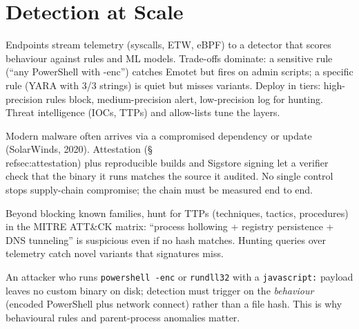 \section{Detection at Scale}
\label{sec:detection-scale}
Endpoints stream telemetry (syscalls, ETW, eBPF) to a detector that scores behaviour against rules and ML models. Trade-offs dominate: a sensitive rule (``any PowerShell with -enc'') catches Emotet but fires on admin scripts; a specific rule (YARA with 3/3 strings) is quiet but misses variants. Deploy in tiers: high-precision rules block, medium-precision alert, low-precision log for hunting. Threat intelligence (IOCs, TTPs) and allow-lists tune the layers.

\begin{remark}
Modern malware often arrives via a compromised dependency or update (SolarWinds, 2020). Attestation (\S\\ref{sec:attestation}) plus reproducible builds and Sigstore signing let a verifier check that the binary it runs matches the source it audited. No single control stops supply-chain compromise; the chain must be measured end to end.
\end{remark}

\begin{remark}
Beyond blocking known families, hunt for TTPs (techniques, tactics, procedures) in the MITRE ATT\&CK matrix: ``process hollowing + registry persistence + DNS tunneling'' is suspicious even if no hash matches. Hunting queries over telemetry catch novel variants that signatures miss.
\end{remark}

{\sloppy
\begin{example}
An attacker who runs \texttt{powershell -enc} or \texttt{rundll32} with a \texttt{javascript:} payload leaves no custom binary on disk; detection must trigger on the \emph{behaviour} (encoded PowerShell plus network connect) rather than a file hash. This is why behavioural rules and parent-process anomalies matter.
\end{example}
\par}

